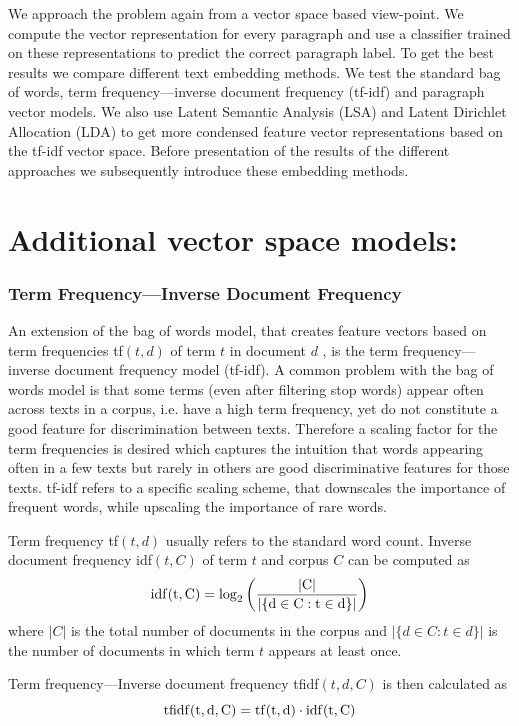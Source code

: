 We approach the problem again from a vector space based view-point. We compute the vector representation for every paragraph and use a classifier trained on these representations to predict the correct paragraph label. To get the best results we compare different text embedding methods. We test the standard bag of words, term frequency---inverse document frequency (tf-idf) and paragraph vector models. We also use Latent Semantic Analysis (LSA) and Latent Dirichlet Allocation (LDA) to get more condensed feature vector representations based on the tf-idf vector space. Before presentation of the results of the different approaches we subsequently introduce these embedding methods.

\section*{Additional vector space models:}

\subsubsection*{Term Frequency---Inverse Document Frequency}

An extension of the bag of words model, that creates feature vectors based on term frequencies tf$(t,d)$ of term $t$ in document $d$ , is the term frequency---inverse document frequency model (tf-idf).
A common problem with the bag of words model is that some terms (even
after filtering stop words) appear often across texts in a corpus,
i.e. have a high term frequency, yet do not constitute a good feature
for discrimination between texts. Therefore a scaling factor for the
term frequencies is desired which captures the intuition that words
appearing often in a few texts but rarely in others are good discriminative
features for those texts. tf-idf refers to a specific scaling scheme, that downscales the
importance of frequent words, while upscaling the importance of rare
words. 

Term frequency tf$(t,d)$ usually refers to the standard word count.
Inverse document frequency idf$(t,C)$ of term $t$ and corpus $C$
can be computed as 
\[
\rm{idf}(t,C)=\log_{2}\left(\frac{|C|}{|\{d\in C:t\in d\}|}\right)
\]
where $|C|$ is the total number of documents in the corpus and $|\{d\in C:t\in d\}|$
is the number of documents in which term $t$ appears at least once.

Term frequency---Inverse document frequency tfidf$(t,d,C)$ is then
calculated as 
\[
\rm{tfidf}(t,d,C)=\rm{tf}(t,d)\cdot \rm{idf}(t,C)
\]


